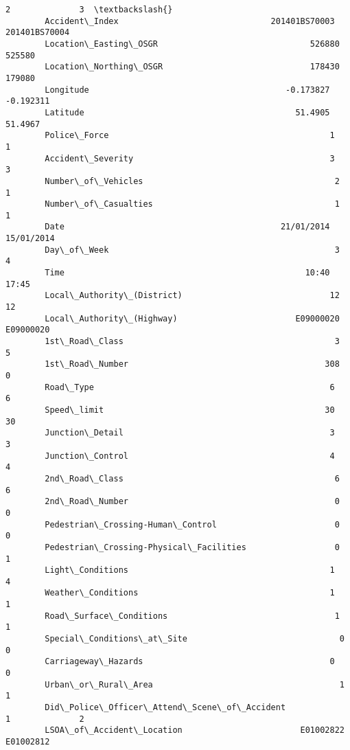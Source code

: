 \documentclass[11pt]{article}
\begin{document}
\begin{Verbatim}[commandchars=\\\{\}]
                                                                 2              3  \textbackslash{}
        Accident\_Index                               201401BS70003  201401BS70004   
        Location\_Easting\_OSGR                               526880         525580   
        Location\_Northing\_OSGR                              178430         179080   
        Longitude                                        -0.173827      -0.192311   
        Latitude                                           51.4905        51.4967   
        Police\_Force                                             1              1   
        Accident\_Severity                                        3              3   
        Number\_of\_Vehicles                                       2              1   
        Number\_of\_Casualties                                     1              1   
        Date                                            21/01/2014     15/01/2014   
        Day\_of\_Week                                              3              4   
        Time                                                 10:40          17:45   
        Local\_Authority\_(District)                              12             12   
        Local\_Authority\_(Highway)                        E09000020      E09000020   
        1st\_Road\_Class                                           3              5   
        1st\_Road\_Number                                        308              0   
        Road\_Type                                                6              6   
        Speed\_limit                                             30             30   
        Junction\_Detail                                          3              3   
        Junction\_Control                                         4              4   
        2nd\_Road\_Class                                           6              6   
        2nd\_Road\_Number                                          0              0   
        Pedestrian\_Crossing-Human\_Control                        0              0   
        Pedestrian\_Crossing-Physical\_Facilities                  0              1   
        Light\_Conditions                                         1              4   
        Weather\_Conditions                                       1              1   
        Road\_Surface\_Conditions                                  1              1   
        Special\_Conditions\_at\_Site                               0              0   
        Carriageway\_Hazards                                      0              0   
        Urban\_or\_Rural\_Area                                      1              1   
        Did\_Police\_Officer\_Attend\_Scene\_of\_Accident              1              2   
        LSOA\_of\_Accident\_Location                        E01002822      E01002812   
        

\end{Verbatim}
\end{document}
